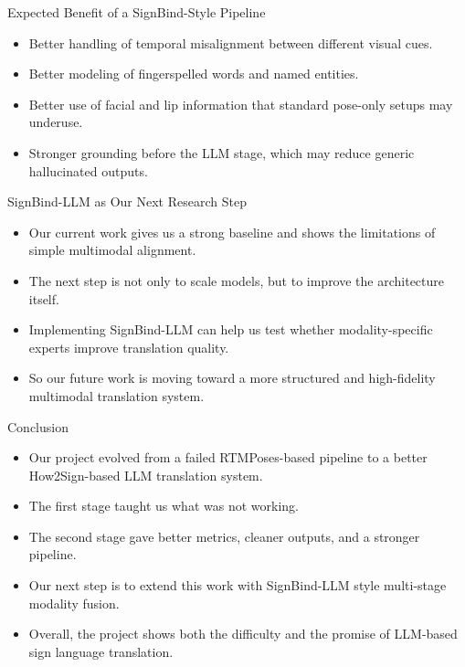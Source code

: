 \documentclass[aspectratio=169]{beamer}
\begin{document}
\begin{frame}{Expected Benefit of a SignBind-Style Pipeline}
\begin{itemize}
  \item Better handling of temporal misalignment between different visual cues.
  \item Better modeling of fingerspelled words and named entities.
  \item Better use of facial and lip information that standard pose-only setups may underuse.
  \item Stronger grounding before the LLM stage, which may reduce generic hallucinated outputs.
\end{itemize}
\end{frame}

\begin{frame}{SignBind-LLM as Our Next Research Step}
\begin{itemize}
  \item Our current work gives us a strong baseline and shows the limitations of simple multimodal alignment.
  \item The next step is not only to scale models, but to improve the architecture itself.
  \item Implementing SignBind-LLM can help us test whether modality-specific experts improve translation quality.
  \item So our future work is moving toward a more structured and high-fidelity multimodal translation system.
\end{itemize}
\end{frame}

\begin{frame}{Conclusion}
\begin{itemize}
  \item Our project evolved from a failed RTMPoses-based pipeline to a better How2Sign-based LLM translation system.
  \item The first stage taught us what was not working.
  \item The second stage gave better metrics, cleaner outputs, and a stronger pipeline.
  \item Our next step is to extend this work with SignBind-LLM style multi-stage modality fusion.
  \item Overall, the project shows both the difficulty and the promise of LLM-based sign language translation.
\end{itemize}
\end{frame}
\end{document}
